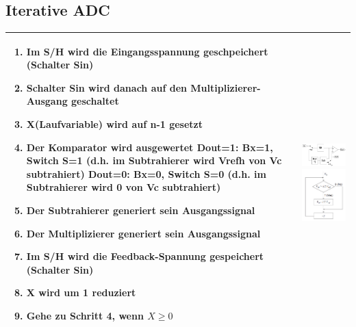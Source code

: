 \subsection{Iterative ADC}
\begin{longtable}{|p{12cm}|p{6cm}|}
  \hline
    \begin{enumerate}
      \item Im S/H wird die Eingangsspannung geschpeichert (Schalter Sin)
      \item Schalter Sin wird danach auf den Multiplizierer-Ausgang geschaltet
      \item X(Laufvariable) wird auf n-1 gesetzt
      \item Der Komparator wird ausgewertet\newline
        Dout=1: Bx=1, Switch S=1 (d.h. im Subtrahierer wird Vrefh von Vc
        subtrahiert)\newline
        Dout=0: Bx=0, Switch S=0 (d.h. im Subtrahierer wird 0 von Vc
        subtrahiert)
      \item Der Subtrahierer generiert sein Ausgangssignal
      \item Der Multiplizierer generiert sein Ausgangssignal
      \item Im S/H wird die Feedback-Spannung gespeichert (Schalter Sin)
      \item X wird um 1 reduziert
      \item Gehe zu Schritt 4, wenn $X\geq0$
    \end{enumerate} &
    \includegraphics[width=4cm, valign=t]{images/iterativeADC}\newline
    \includegraphics[width=4cm, valign=t]{images/iterativeADC_ablauf}\\
  \hline
\end{longtable}



